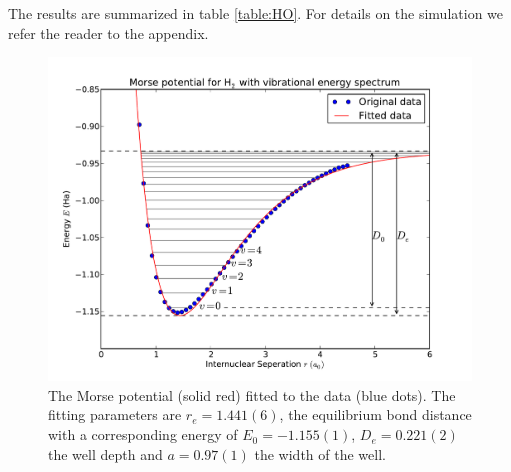 \documentclass{article}
\begin{document}
The results are summarized in table \ref{table:HO}. For details on the simulation we refer the reader to the appendix. \\

\begin{figure}
 \centering
 \includegraphics[width=\linewidth]{plot.pdf}
 \caption{The Morse potential (solid red) fitted to the data (blue dots). The fitting parameters are $r_e=1.441(6)$, the equilibrium bond distance with a corresponding energy of $E_0=-1.155(1)$, $D_e=0.221(2)$ the well depth and $a=0.97(1)$ the width of the well.}\label{fig:plot}
\end{figure}
\end{document}
